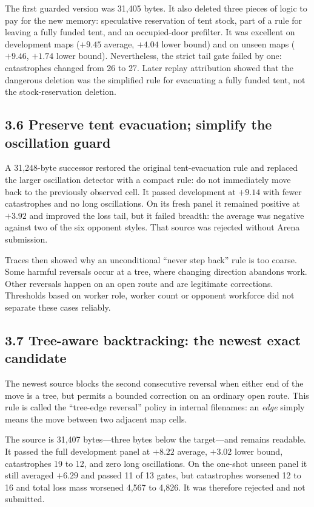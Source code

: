 \documentclass[10pt,a4paper]{article}
\begin{document}
The first guarded version was 31,405 bytes. It also deleted three pieces of logic to pay for the
new memory: speculative reservation of tent stock, part of a rule for leaving a fully funded
tent, and an occupied-door prefilter. It was excellent on development maps ($+9.45$ average,
$+4.04$ lower bound) and on unseen maps ($+9.46$, $+1.74$ lower bound). Nevertheless, the strict
tail gate failed by one: catastrophes changed from 26 to 27. Later replay attribution showed
that the dangerous deletion was the simplified rule for evacuating a fully funded tent, not the
stock-reservation deletion.

\subsection*{3.6 Preserve tent evacuation; simplify the oscillation guard}

A 31,248-byte successor restored the original tent-evacuation rule and replaced the larger
oscillation detector with a compact rule: do not immediately move back to the previously observed
cell. It passed development at $+9.14$ with fewer catastrophes and no long oscillations. On its
fresh panel it remained positive at $+3.92$ and improved the loss tail, but it failed breadth:
the average was negative against two of the six opponent styles. That source was rejected without
Arena submission.

Traces then showed why an unconditional ``never step back'' rule is too coarse. Some harmful
reversals occur at a tree, where changing direction abandons work. Other reversals happen on an
open route and are legitimate corrections. Thresholds based on worker role, worker count or
opponent workforce did not separate these cases reliably.

\subsection*{3.7 Tree-aware backtracking: the newest exact candidate}

The newest source blocks the second consecutive reversal when either end of the move is a tree,
but permits a bounded correction on an ordinary open route. This rule is called the
``tree-edge reversal'' policy in internal filenames: an \emph{edge} simply means the move between
two adjacent map cells.

The source is 31,407 bytes---three bytes below the target---and remains readable. It passed the
full development panel at $+8.22$ average, $+3.02$ lower bound, catastrophes 19 to 12, and zero
long oscillations. On the one-shot unseen panel it still averaged $+6.29$ and passed 11 of 13
gates, but catastrophes worsened 12 to 16 and total loss mass worsened 4,567 to 4,826. It was
therefore rejected and not submitted.
\end{document}
